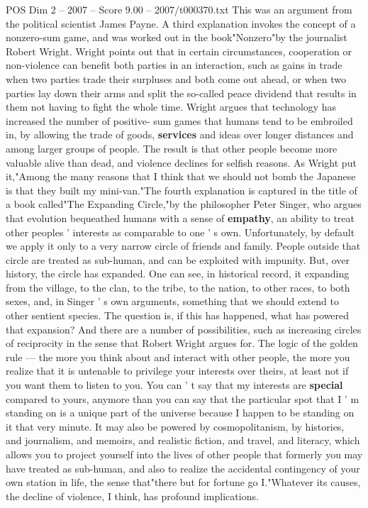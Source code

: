\begin{textsample}{POS Dim 2 – 2007 – Score 9.00 – 2007/t000370.txt}
This was an argument from the political scientist James Payne.
A third explanation invokes the concept of a nonzero-sum game, and was worked out in the book"Nonzero"by the journalist Robert Wright.
Wright points out that in certain circumstances, cooperation or non-violence can benefit both parties in an interaction, such as gains in trade when two parties trade their surpluses and both come out ahead, or when two parties lay down their arms and split the so-called peace dividend that results in them not having to fight the whole time.
Wright argues that technology has increased the number of positive- sum games that humans tend to be embroiled in, by allowing the trade of goods, \textbf{services} and ideas over longer distances and among larger groups of people.
The result is that other people become more valuable alive than dead, and violence declines for selfish reasons.
As Wright put it,"Among the many reasons that I think that we should not bomb the Japanese is that they built my mini-van."The fourth explanation is captured in the title of a book called"The Expanding Circle,"by the philosopher Peter Singer, who argues that evolution bequeathed humans with a sense of \textbf{empathy}, an ability to treat other peoples ' interests as comparable to one ' s own.
Unfortunately, by default we apply it only to a very narrow circle of friends and family.
People outside that circle are treated as sub-human, and can be exploited with impunity.
But, over history, the circle has expanded.
One can see, in historical record, it expanding from the village, to the clan, to the tribe, to the nation, to other races, to both sexes, and, in Singer ' s own arguments, something that we should extend to other sentient species.
The question is, if this has happened, what has powered that expansion?
And there are a number of possibilities, such as increasing circles of reciprocity in the sense that Robert Wright argues for.
The logic of the golden rule — the more you think about and interact with other people, the more you realize that it is untenable to privilege your interests over theirs, at least not if you want them to listen to you.
You can ' t say that my interests are \textbf{special} compared to yours, anymore than you can say that the particular spot that I ' m standing on is a unique part of the universe because I happen to be standing on it that very minute.
It may also be powered by cosmopolitanism, by histories, and journalism, and memoirs, and realistic fiction, and travel, and literacy, which allows you to project yourself into the lives of other people that formerly you may have treated as sub-human, and also to realize the accidental contingency of your own station in life, the sense that"there but for fortune go I."Whatever its causes, the decline of violence, I think, has profound implications.

\end{textsample}
